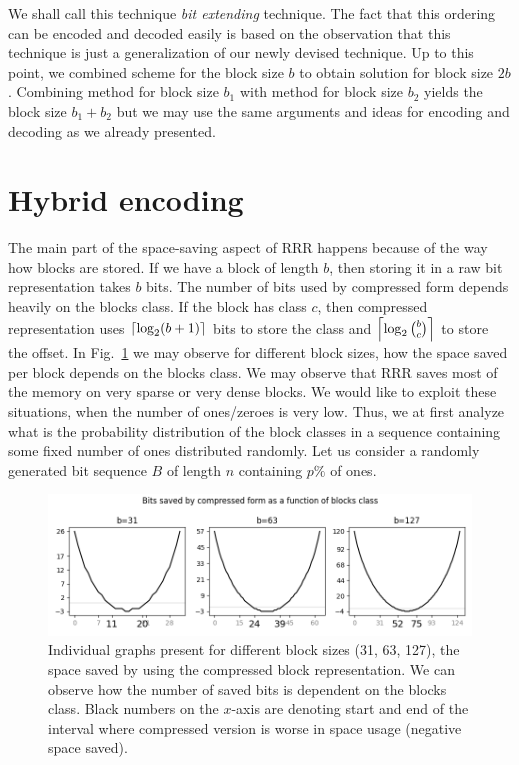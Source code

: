 We shall call this technique \textit{bit extending} technique. The fact that this
ordering can be encoded and decoded easily is based on the observation that this technique
is just a generalization of our newly devised technique. Up to this point, we combined
scheme for the block size $b$ to obtain solution for block size $2b$. Combining method
for block size $b_1$ with method for block size $b_2$ yields the block size $b_1+b_2$
but we may use the same arguments and ideas for encoding and decoding as we already presented. 

\section{Hybrid encoding}


The main part of the space-saving aspect of RRR happens because of the way how blocks are stored.
If we have a block of length $b$, then storing it in a raw bit representation takes $b$ bits.
The number of bits used by compressed form depends heavily on the blocks class. If the block
has class $c$, then compressed representation uses $\left\lceil \log_2 (b+1) \right\rceil$ bits to store the
class and $\left\lceil \log_2{b\choose c} \right\rceil$ to store the offset. In Fig.~\ref{obr:rrrSpaceSavings}
we may observe for different block sizes, how the space saved per block depends on the blocks
class. We may observe that RRR saves most of the memory on very sparse or very dense blocks.
We would like to exploit these situations, when the number of ones/zeroes is very low. Thus,
we at first analyze what is the probability distribution of the block classes in a sequence
containing some fixed number of ones distributed randomly. Let us consider a randomly generated
bit sequence $B$ of length $n$ containing $p\%$ of ones.

\begin{figure}
	\centerline{
		\includegraphics[width=\textwidth]{images/rrr_space_savings}
	}
	\caption[TODO]{Individual graphs present for different block sizes (31, 63, 127), 
    the space saved by using the compressed block representation. We can observe how
    the number of saved bits is dependent on the blocks class. Black numbers on the $x$-axis
    are denoting start and end of the interval where compressed version is worse
    in space usage (negative space saved).
	}
	\label{obr:rrrSpaceSavings}
\end{figure}

